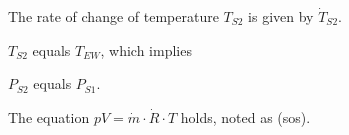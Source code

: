 The rate of change of temperature \( T_{S2} \) is given by \( \dot{T}_{S2} \).

\( T_{S2} \) equals \( T_{EW} \), which implies

\( P_{S2} \) equals \( P_{S1} \).

The equation \( pV = \dot{m} \cdot \dot{R} \cdot T \) holds, noted as (sos).